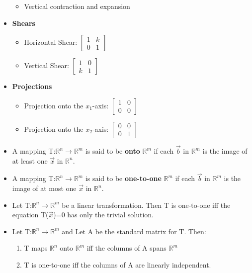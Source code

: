 \documentclass{report}
\newcommand{\Vx}{$\vec{x}$}
\newcommand{\Rn}{$\mathbb{R}^n$}
\newcommand{\Rm}{$\mathbb{R}^m$}
\begin{document}
\begin{itemize}
\begin{itemize}
			\item Vertical contraction and expansion
		\end{itemize}
		\item \textbf{Shears}
		\begin{itemize}\addtolength{\leftskip}{2em}
			\item Horizontal Shear: 
				$\begin{bmatrix}
				1 & k\\
				0 & 1
				\end{bmatrix}$
			\item Vertical Shear: 
				$\begin{bmatrix}
				1 & 0\\
				k & 1
				\end{bmatrix}$
		\end{itemize}
		\item \textbf{Projections}
		\begin{itemize}\addtolength{\leftskip}{2em}
			\item Projection onto the $x_1$-axis: 
				$\begin{bmatrix}
				1 & 0\\
				0 & 0
				\end{bmatrix}$
			\item Projection onto the $x_2$-axis: 
				$\begin{bmatrix}
				0 & 0\\
				0 & 1
				\end{bmatrix}$
		\end{itemize}
		\item A mapping T:\Rn$\rightarrow${\Rm} is said to be \textbf{onto} {\Rm} if each $\vec{b}$ in {\Rm} is the image of at least one $\vec{x}$ in {\Rn}.
		\item A mapping T:\Rn$\rightarrow${\Rm} is said to be \textbf{one-to-one} {\Rm} if each $\vec{b}$ in {\Rm} is the image of at most one $\vec{x}$ in {\Rn}.
		\item Let T:\Rn$\rightarrow${\Rm} be a linear transformation. Then T is one-to-one iff the equation T(\Vx)=0 has only the trivial solution.
		\item Let T:\Rn$\rightarrow${\Rm} and Let A be the standard matrix for T. Then:
			\begin{enumerate}\addtolength{\leftskip}{4em}
			\item T maps {\Rn} onto {\Rm} iff the columns of A spans {\Rm}
			\item T is one-to-one iff the columns of A are linearly independent. 
			\end{enumerate}
	\end{itemize}
\end{document}
